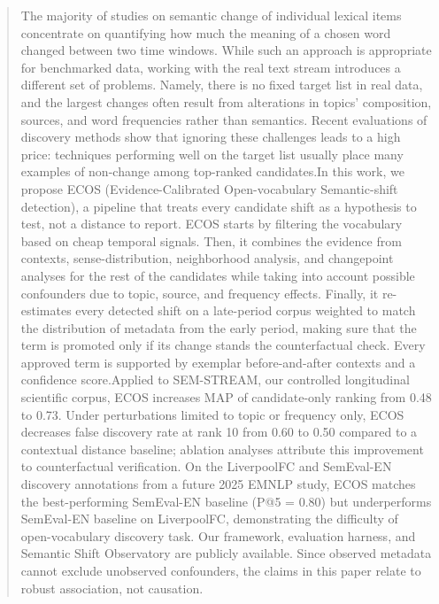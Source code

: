 \documentclass{llncs}
\begin{document}
\begin{abstract}
The majority of studies on semantic change of individual lexical items concentrate on quantifying how much the meaning of a chosen word changed between two time windows. While such an approach is appropriate for benchmarked data, working with the real text stream introduces a different set of problems. Namely, there is no fixed target list in real data, and the largest changes often result from alterations in topics' composition, sources, and word frequencies rather than semantics. Recent evaluations of discovery methods show that ignoring these challenges leads to a high price: techniques performing well on the target list usually place many examples of non-change among top-ranked candidates.In this work, we propose ECOS (Evidence-Calibrated Open-vocabulary Semantic-shift detection), a pipeline that treats every candidate shift as a hypothesis to test, not a distance to report. ECOS starts by filtering the vocabulary based on cheap temporal signals. Then, it combines the evidence from contexts, sense-distribution, neighborhood analysis, and changepoint analyses for the rest of the candidates while taking into account possible confounders due to topic, source, and frequency effects. Finally, it re-estimates every detected shift on a late-period corpus weighted to match the distribution of metadata from the early period, making sure that the term is promoted only if its change stands the counterfactual check. Every approved term is supported by exemplar before-and-after contexts and a confidence score.Applied to SEM-STREAM, our controlled longitudinal scientific corpus, ECOS increases MAP of candidate-only ranking from 0.48 to 0.73. Under perturbations limited to topic or frequency only, ECOS decreases false discovery rate at rank 10 from 0.60 to 0.50 compared to a contextual distance baseline; ablation analyses attribute this improvement to counterfactual verification. On the LiverpoolFC and SemEval-EN discovery annotations from a future 2025 EMNLP study, ECOS matches the best-performing SemEval-EN baseline (P@5 = 0.80) but underperforms SemEval-EN baseline on LiverpoolFC, demonstrating the difficulty of open-vocabulary discovery task. Our framework, evaluation harness, and Semantic Shift Observatory are publicly available. Since observed metadata cannot exclude unobserved confounders, the claims in this paper relate to robust association, not causation.
\end{abstract}
\end{document}
